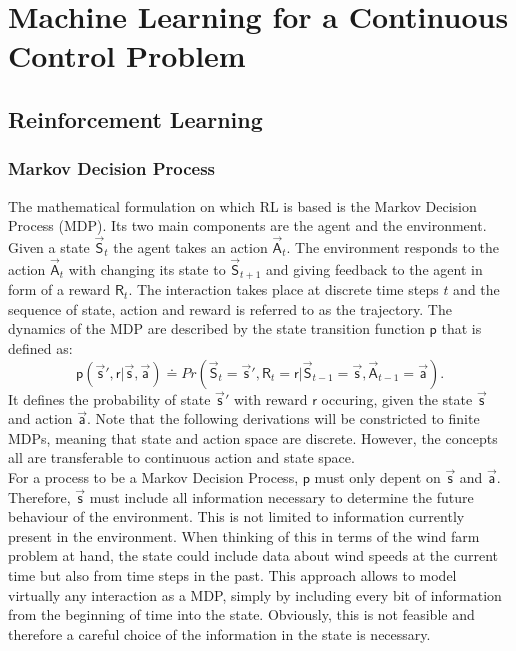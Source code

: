 \section{Machine Learning for a Continuous Control Problem}
\subsection{Reinforcement Learning}
\subsubsection{Markov Decision Process}
The mathematical formulation on which RL is based is the Markov Decision Process (MDP). Its two main components are the agent and the environment. Given a state $\vec{\mathsf{S}}_t$ the agent takes an action $\vec{\mathsf{A}}_t$. The environment responds to the action $\vec{\mathsf{A}}_t$ with changing its state to $\vec{\mathsf{S}}_{t+1}$ and giving feedback to the agent in form of a reward $\mathsf{R}_t$. The interaction takes place at discrete time steps $t$ and the sequence of state, action and reward is referred to as the trajectory. The dynamics of the MDP are described by the state transition function $\mathsf{p}$ that is defined as:
\begin{equation}
\mathsf{p}(\vec{\mathsf{s}}',\mathsf{r} \vert \vec{\mathsf{s}},\vec{\mathsf{a}}) \doteq Pr(\vec{\mathsf{S}}_t=\vec{\mathsf{s}}', \mathsf{R}_t=\mathsf{r} \vert \vec{\mathsf{S}}_{t-1} = \vec{\mathsf{s}}, \vec{\mathsf{A}}_{t-1} = \vec{\mathsf{a}}). \label{eq:prob_func}
\end{equation}
It defines the probability of state $\vec{\mathsf{s}}'$ with reward $\mathsf{r}$ occuring, given the state $\vec{\mathsf{s}}$ and action $\vec{\mathsf{a}}$. Note that the following derivations will be constricted to finite MDPs, meaning that state and action space are discrete. However, the concepts all are transferable to continuous action and state space. \\
For a process to be a Markov Decision Process, $\mathsf{p}$ must only depent on $\vec{\mathsf{s}}$ and $\vec{\mathsf{a}}$. Therefore, $\vec{\mathsf{s}}$ must include all information necessary to determine the future behaviour of the environment. This is not limited to information currently present in the environment. When thinking of this in terms of the wind farm problem at hand, the state could include data about wind speeds at the current time but also from time steps in the past. This approach allows to model virtually any interaction as a MDP, simply by including every bit of information from the beginning of time into the state. Obviously, this is not feasible and therefore a careful choice of the information in the state is necessary. \\
